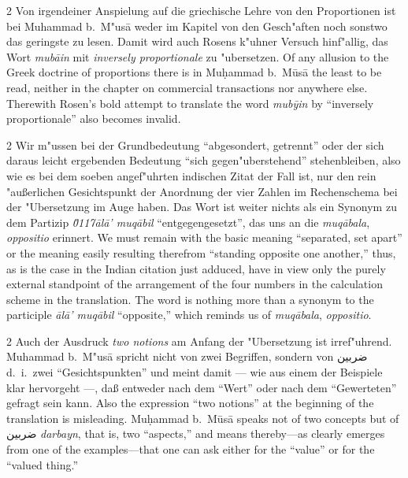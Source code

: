 \documentclass[10pt,a4paper]{article}
\renewcommand{\switchcolumn}{\syncronize\nointerlineskip\columnbreak}
\newcommand{\RL}[1]{\beginR#1\endR}
\newcommand{\ar}[1]{{\arabicfont\RL{#1}}}
\newcommand{\enquote}[1]{``#1''}
\begin{document}
\begin{paracol}{2}
Von irgendeiner Anspielung auf die griechische Lehre von den Proportionen ist bei Muhammad b.\ M"us\=a weder im Kapitel von den Gesch"aften noch sonstwo das geringste zu lesen. Damit wird auch Rosens k"uhner Versuch hinf"allig, das Wort \textit{mub\=ain} mit \textit{inversely proportionale} zu "ubersetzen.
\switchcolumn
Of any allusion to the Greek doctrine of proportions there is in Mu\d{h}ammad b.\ M\=us\=a the least to be read, neither in the chapter on commercial transactions nor anywhere else. Therewith Rosen's bold attempt to translate the word \textit{mub\=yin} by ``inversely proportionale'' also becomes invalid.
\end{paracol}

\begin{paracol}{2}
Wir m"ussen bei der Grundbedeutung \enquote{abgesondert, getrennt} oder der sich daraus leicht ergebenden Bedeutung \enquote{sich gegen"uberstehend} stehenbleiben, also wie es bei dem soeben angef"uhrten indischen Zitat der Fall ist, nur den rein "au\ss{}erlichen Gesichtspunkt der Anordnung der vier Zahlen im Rechenschema bei der "Ubersetzung im Auge haben. Das Wort ist weiter nichts als ein Synonym zu dem Partizip \textit{\u0117\=al\=a' muq\=abil} \enquote{entgegengesetzt}, das uns an die \textit{muq\=abala}, \textit{oppositio} erinnert.
\switchcolumn
We must remain with the basic meaning ``separated, set apart'' or the meaning easily resulting therefrom ``standing opposite one another,'' thus, as is the case in the Indian citation just adduced, have in view only the purely external standpoint of the arrangement of the four numbers in the calculation scheme in the translation. The word is nothing more than a synonym to the participle \textit{\=al\=a' muq\=abil} ``opposite,'' which reminds us of \textit{muq\=abala}, \textit{oppositio}.
\end{paracol}

\begin{paracol}{2}
Auch der Ausdruck \textit{two notions} am Anfang der "Ubersetzung ist irref"uhrend. Muhammad b.\ M"us\=a spricht nicht von zwei Begriffen, sondern von \ar{ضربين} d.\ i.\ zwei \enquote{Gesichtspunkten} und meint damit --- wie aus einem der Beispiele klar hervorgeht ---, da\ss{} entweder nach dem \enquote{Wert} oder nach dem \enquote{Gewerteten} gefragt sein kann.
\switchcolumn
Also the expression ``two notions'' at the beginning of the translation is misleading. Mu\d{h}ammad b.\ M\=us\=a speaks not of two concepts but of \ar{ضربين} \textit{darbayn}, that is, two ``aspects,'' and means thereby---as clearly emerges from one of the examples---that one can ask either for the ``value'' or for the ``valued thing.''
\end{paracol}
\end{document}

